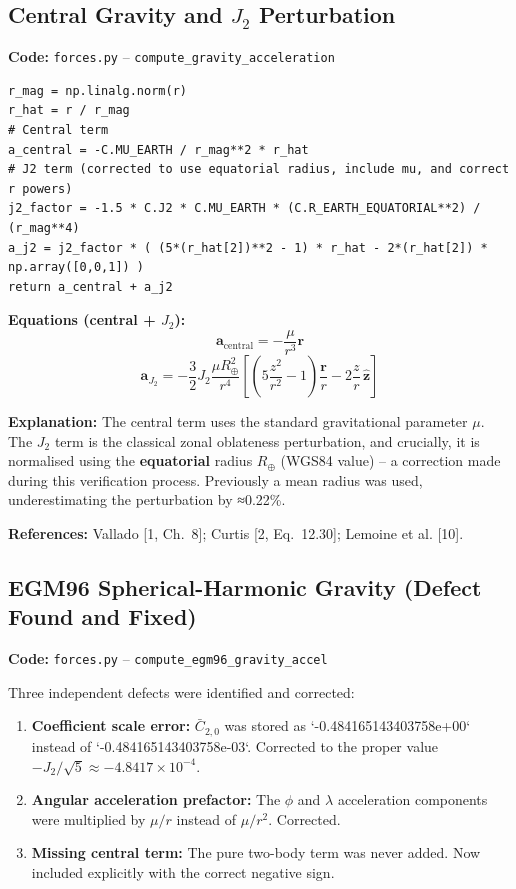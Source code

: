 \documentclass[12pt,a4paper]{article}
\begin{document}
\subsection{Central Gravity and $J_2$ Perturbation}

\textbf{Code:} \texttt{forces.py} – \texttt{compute\_gravity\_acceleration}
\begin{verbatim}
r_mag = np.linalg.norm(r)
r_hat = r / r_mag
# Central term
a_central = -C.MU_EARTH / r_mag**2 * r_hat
# J2 term (corrected to use equatorial radius, include mu, and correct r powers)
j2_factor = -1.5 * C.J2 * C.MU_EARTH * (C.R_EARTH_EQUATORIAL**2) / (r_mag**4)
a_j2 = j2_factor * ( (5*(r_hat[2])**2 - 1) * r_hat - 2*(r_hat[2]) * np.array([0,0,1]) )
return a_central + a_j2
\end{verbatim}

\textbf{Equations (central + $J_2$):}
\[
\mathbf{a}_{\text{central}} = -\frac{\mu}{r^3}\mathbf{r}
\]
\[
\mathbf{a}_{J_2} = -\frac{3}{2} J_2 \frac{\mu R_{\oplus}^2}{r^4}
\left[ \left(5\frac{z^2}{r^2} - 1\right)\frac{\mathbf{r}}{r} - 2\frac{z}{r}\,\hat{\mathbf{z}} \right]
\]

\textbf{Explanation:} The central term uses the standard gravitational parameter $\mu$. The $J_2$ term is the classical zonal oblateness perturbation, and crucially, it is normalised using the \textbf{equatorial} radius $R_{\oplus}$ (WGS84 value) -- a correction made during this verification process. Previously a mean radius was used, underestimating the perturbation by ≈0.22\%.

\textbf{References:} Vallado [1, Ch.~8]; Curtis [2, Eq.~12.30]; Lemoine et al. [10].

\subsection{EGM96 Spherical-Harmonic Gravity (Defect Found and Fixed)}

\textbf{Code:} \texttt{forces.py} – \texttt{compute\_egm96\_gravity\_accel}

Three independent defects were identified and corrected:
\begin{enumerate}
\item \textbf{Coefficient scale error:} $\bar{C}_{2,0}$ was stored as `-0.484165143403758e+00` instead of `-0.484165143403758e-03`. Corrected to the proper value $-J_2/\sqrt{5} \approx -4.8417\times10^{-4}$.
\item \textbf{Angular acceleration prefactor:} The $\phi$ and $\lambda$ acceleration components were multiplied by $\mu/r$ instead of $\mu/r^2$. Corrected.
\item \textbf{Missing central term:} The pure two-body term was never added. Now included explicitly with the correct negative sign.
\end{enumerate}
\end{document}
